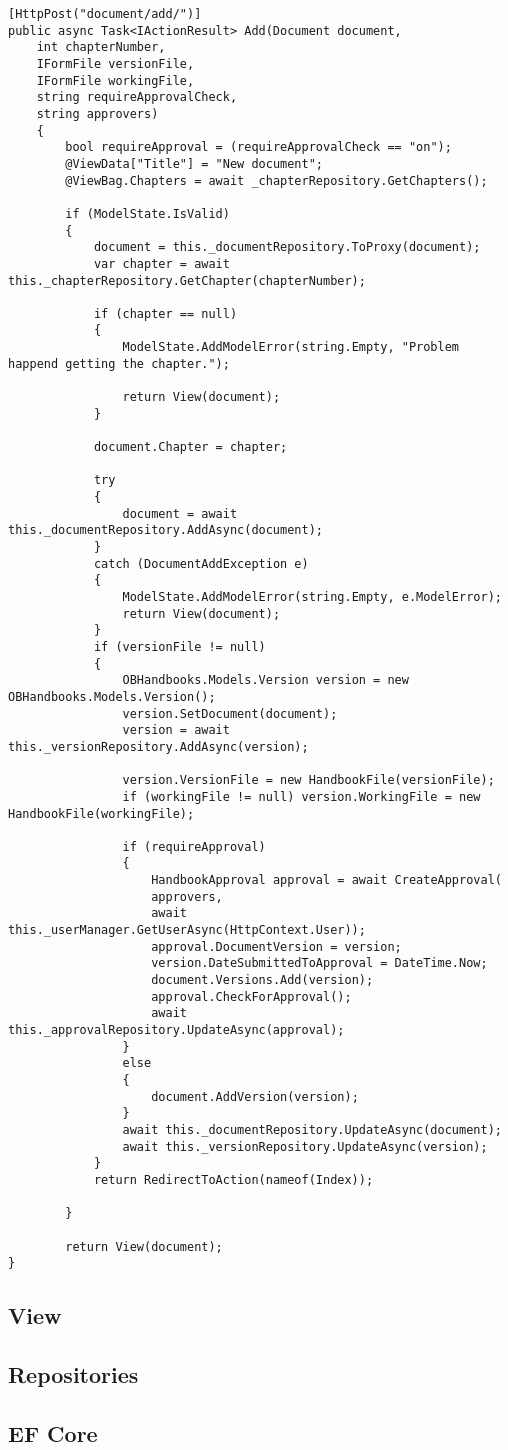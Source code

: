 \begin{lstlisting}
[HttpPost("document/add/")]
public async Task<IActionResult> Add(Document document,
	int chapterNumber,
	IFormFile versionFile,
	IFormFile workingFile,
	string requireApprovalCheck,
	string approvers)
	{
		bool requireApproval = (requireApprovalCheck == "on");
		@ViewData["Title"] = "New document";
		@ViewBag.Chapters = await _chapterRepository.GetChapters();

		if (ModelState.IsValid)
		{
			document = this._documentRepository.ToProxy(document);
			var chapter = await this._chapterRepository.GetChapter(chapterNumber);

			if (chapter == null)
			{
				ModelState.AddModelError(string.Empty, "Problem happend getting the chapter.");

				return View(document);
			}

			document.Chapter = chapter;

			try
			{
				document = await this._documentRepository.AddAsync(document);
			}
			catch (DocumentAddException e)
			{
				ModelState.AddModelError(string.Empty, e.ModelError);
				return View(document);
			}
			if (versionFile != null)
			{
				OBHandbooks.Models.Version version = new OBHandbooks.Models.Version();
				version.SetDocument(document);
				version = await this._versionRepository.AddAsync(version);

				version.VersionFile = new HandbookFile(versionFile);
				if (workingFile != null) version.WorkingFile = new HandbookFile(workingFile);

				if (requireApproval)
				{
					HandbookApproval approval = await CreateApproval(
					approvers,
					await this._userManager.GetUserAsync(HttpContext.User));
					approval.DocumentVersion = version;
					version.DateSubmittedToApproval = DateTime.Now;
					document.Versions.Add(version);
					approval.CheckForApproval();
					await this._approvalRepository.UpdateAsync(approval);
				}
				else
				{
					document.AddVersion(version);
				}
				await this._documentRepository.UpdateAsync(document);
				await this._versionRepository.UpdateAsync(version);
			}
			return RedirectToAction(nameof(Index));

		}

		return View(document);
}

\end{lstlisting}

\subsection{View}

\subsection{Repositories}

\subsection{EF Core}
